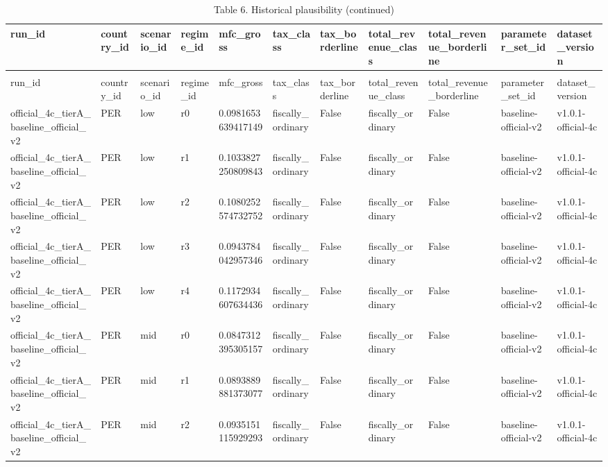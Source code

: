 \begin{landscape}
\fontsize{6.5}{7.8}\selectfont
\setlength{\tabcolsep}{1.5pt}
\begin{longtable}{lllllllllll}
\caption{Table 6. Historical plausibility}\label{tab:results_plausibility}\\
\toprule
run\_id & country\_id & scenario\_id & regime\_id & mfc\_gross & tax\_class & tax\_borderline & total\_revenue\_class & total\_revenue\_borderline & parameter\_set\_id & dataset\_version \\
\midrule
\endfirsthead
\caption[]{Table 6. Historical plausibility (continued)}\\
\toprule
run\_id & country\_id & scenario\_id & regime\_id & mfc\_gross & tax\_class & tax\_borderline & total\_revenue\_class & total\_revenue\_borderline & parameter\_set\_id & dataset\_version \\
\midrule
\endhead
official\_4c\_tierA\_baseline\_official\_v2 & PER & low & r0 & 0.0981653639417149 & fiscally\_ordinary & False & fiscally\_ordinary & False & baseline-official-v2 & v1.0.1-official-4c \\
official\_4c\_tierA\_baseline\_official\_v2 & PER & low & r1 & 0.1033827250809843 & fiscally\_ordinary & False & fiscally\_ordinary & False & baseline-official-v2 & v1.0.1-official-4c \\
official\_4c\_tierA\_baseline\_official\_v2 & PER & low & r2 & 0.1080252574732752 & fiscally\_ordinary & False & fiscally\_ordinary & False & baseline-official-v2 & v1.0.1-official-4c \\
official\_4c\_tierA\_baseline\_official\_v2 & PER & low & r3 & 0.0943784042957346 & fiscally\_ordinary & False & fiscally\_ordinary & False & baseline-official-v2 & v1.0.1-official-4c \\
official\_4c\_tierA\_baseline\_official\_v2 & PER & low & r4 & 0.1172934607634436 & fiscally\_ordinary & False & fiscally\_ordinary & False & baseline-official-v2 & v1.0.1-official-4c \\
official\_4c\_tierA\_baseline\_official\_v2 & PER & mid & r0 & 0.0847312395305157 & fiscally\_ordinary & False & fiscally\_ordinary & False & baseline-official-v2 & v1.0.1-official-4c \\
official\_4c\_tierA\_baseline\_official\_v2 & PER & mid & r1 & 0.0893889881373077 & fiscally\_ordinary & False & fiscally\_ordinary & False & baseline-official-v2 & v1.0.1-official-4c \\
official\_4c\_tierA\_baseline\_official\_v2 & PER & mid & r2 & 0.0935151115929293 & fiscally\_ordinary & False & fiscally\_ordinary & False & baseline-official-v2 & v1.0.1-official-4c \\

\end{longtable}
\end{landscape}
